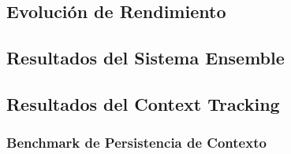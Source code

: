 
\subsection{Evoluci\'on de Rendimiento}
\label{subsec:evolucion-rendimiento}


\subsection{Resultados del Sistema Ensemble}
\label{subsec:resultados-ensemble}


\subsection{Resultados del Context Tracking}
\label{subsec:resultados-context}

\subsubsection{Benchmark de Persistencia de Contexto}
\label{subsubsec:benchmark-contexto}


